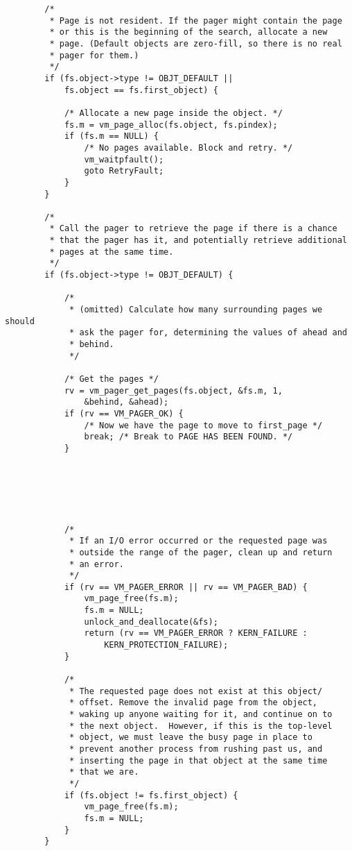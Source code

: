 \documentclass[shortabstract, english]{iithesis}
\newenvironment{code}{}{}
\begin{document}
\begin{code}
\begin{verbatim}
        /*
         * Page is not resident. If the pager might contain the page
         * or this is the beginning of the search, allocate a new
         * page. (Default objects are zero-fill, so there is no real
         * pager for them.)
         */
        if (fs.object->type != OBJT_DEFAULT ||
            fs.object == fs.first_object) {

            /* Allocate a new page inside the object. */
            fs.m = vm_page_alloc(fs.object, fs.pindex);
            if (fs.m == NULL) {
                /* No pages available. Block and retry. */
                vm_waitpfault();
                goto RetryFault;
            }
        }

        /*
         * Call the pager to retrieve the page if there is a chance
         * that the pager has it, and potentially retrieve additional
         * pages at the same time.
         */
        if (fs.object->type != OBJT_DEFAULT) {

            /*
             * (omitted) Calculate how many surrounding pages we should
             * ask the pager for, determining the values of ahead and
             * behind.
             */

            /* Get the pages */
            rv = vm_pager_get_pages(fs.object, &fs.m, 1,
                &behind, &ahead);
            if (rv == VM_PAGER_OK) {
                /* Now we have the page to move to first_page */
                break; /* Break to PAGE HAS BEEN FOUND. */
            }






            /*
             * If an I/O error occurred or the requested page was
             * outside the range of the pager, clean up and return
             * an error.
             */
            if (rv == VM_PAGER_ERROR || rv == VM_PAGER_BAD) {
                vm_page_free(fs.m);
                fs.m = NULL;
                unlock_and_deallocate(&fs);
                return (rv == VM_PAGER_ERROR ? KERN_FAILURE :
                    KERN_PROTECTION_FAILURE);
            }

            /*
             * The requested page does not exist at this object/
             * offset. Remove the invalid page from the object,
             * waking up anyone waiting for it, and continue on to
             * the next object.  However, if this is the top-level
             * object, we must leave the busy page in place to
             * prevent another process from rushing past us, and
             * inserting the page in that object at the same time
             * that we are.
             */
            if (fs.object != fs.first_object) {
                vm_page_free(fs.m);
                fs.m = NULL;
            }
        }


\end{verbatim}
\end{code}
\end{document}
